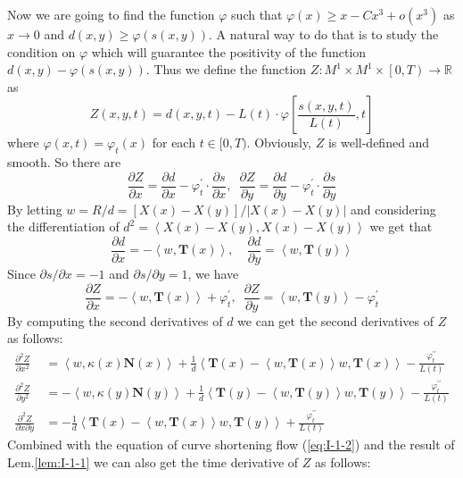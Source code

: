 Now we are going to find the function $\varphi$ such that $\varphi(x)\ge x-Cx^3+o(x^3)$ as $x\to 0$ and $d(x,y)\ge\varphi (s(x,y))$. A natural way to do that is to study the condition on $\varphi$ which will guarantee the positivity of the function $d(x,y)-\varphi (s(x,y))$. Thus we define the function $Z:M^1\times M^1\times\left[0,T\right)\to\mathbb{R}$ as
\begin{equation*}
    Z(x,y,t)=d(x,y,t)-L(t)\cdot\varphi\left[\frac{s(x,y,t)}{L(t)},t\right]
\end{equation*}
where $\varphi(x,t)=\varphi_t(x)$ for each $t\in[0,T)$. Obviously, $Z$ is well-defined and smooth. So there are
\begin{equation*}
    \frac{\partial Z}{\partial x}=\frac{\partial d}{\partial x}-\varphi^\prime_t\cdot\frac{\partial s}{\partial x},\,\,\, \frac{\partial Z}{\partial y}=\frac{\partial d}{\partial y}-\varphi^\prime_t\cdot\frac{\partial s}{\partial y}
\end{equation*}
By letting $w=R/d=[X(x)-X(y)]/\left|X(x)-X(y)\right|$ and considering the differentiation of $d^2=\left<X(x)-X(y),X(x)-X(y)\right>$ we get that
\begin{equation*}
    \frac{\partial d}{\partial x}=-\left<w,\mathbf{T}(x)\right>,\quad \frac{\partial d}{\partial y}=\left<w,\mathbf{T}(y)\right>
\end{equation*}
Since $\partial s/\partial x=-1$ and $\partial s/\partial y=1$, we have
\begin{equation*}
    \frac{\partial Z}{\partial x}=-\left<w,\mathbf{T}(x)\right>+\varphi^\prime_t,\,\,\, \frac{\partial Z}{\partial y}=\left<w,\mathbf{T}(y)\right>-\varphi^\prime_t
\end{equation*}
By computing the second derivatives of $d$ we can get the second derivatives of $Z$ as follows:
\begin{align*}
    \frac{\partial^2 Z}{\partial x^2}&=\left<w,\kappa (x)\mathbf{N}(x)\right>+\frac{1}{d}\left<\mathbf{T}(x)-\left<w,\mathbf{T}(x)\right>w,\mathbf{T}(x)\right>-\frac{\varphi^{\prime\prime}_t}{L(t)}\\
    \frac{\partial^2 Z}{\partial y^2}&=-\left<w,\kappa (y)\mathbf{N}(y)\right>+\frac{1}{d}\left<\mathbf{T}(y)-\left<w,\mathbf{T}(y)\right>w,\mathbf{T}(y)\right>-\frac{\varphi^{\prime\prime}_t}{L(t)}\\
    \frac{\partial^2 Z}{\partial x\partial y}&=-\frac{1}{d}\left<\mathbf{T}(x)-\left<w,\mathbf{T}(x)\right>w,\mathbf{T}(y)\right>+\frac{\varphi^{\prime\prime}_t}{L(t)}
\end{align*}
Combined with the equation of curve shortening flow (\ref{eq:I-1-2}) and the result of Lem.\ref{lem:I-1-1} we can also get the time derivative of $Z$ as follows:
